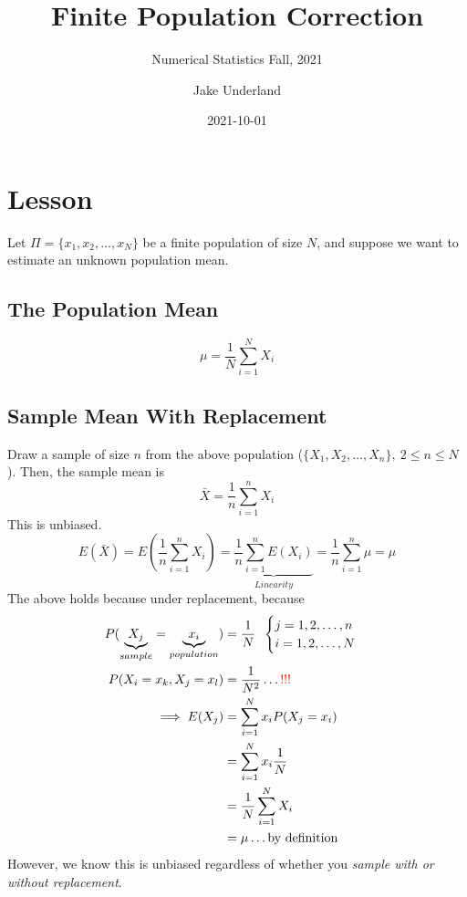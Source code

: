 \documentclass[
]{article}
\title{Finite Population Correction}
\subtitle{Numerical Statistics Fall, 2021}
\author{Jake Underland}
\date{2021-10-01}
\begin{document}
\maketitle

{
\setcounter{tocdepth}{2}
\tableofcontents
}
\hypertarget{lesson}{%
\section{Lesson}\label{lesson}}

Let \(\Pi = \{ x_1, x_2, \dots, x_N\}\) be a finite population of size
\(N\), and suppose we want to estimate an unknown population mean.

\hypertarget{the-population-mean}{%
\subsection{The Population Mean}\label{the-population-mean}}

\[\mu = \frac{1}{N} \sum^N_{i=1} X_i \]

\hypertarget{sample-mean-with-replacement}{%
\subsection{Sample Mean With
Replacement}\label{sample-mean-with-replacement}}

Draw a sample of size \(n\) from the above population
(\(\{X_1, X_2, \dots, X_n\}, \:2 \leq n \leq N\)). Then, the sample mean
is \[\bar{X} = \frac{1}{n}\sum_{i=1}^n X_i\] This is unbiased.
\[E(\bar{X}) = E(\frac{1}{n}\sum_{i=1}^n X_i) = \underbrace{ \frac{1}{n}\sum_{i=1}^n E(X_i)}_{Linearity} =  \frac{1}{n}\sum_{i=1}^n \mu = \mu\]
The above holds because under replacement, because \[\begin{aligned} 
P(\underbrace{X_j}_{sample} = \underbrace{x_i}_{population}) &= \frac{1}{N}\;\; \begin{cases} j = 1, 2, \dots, n \\ i = 1, 2, \dots, N \end{cases} \\
P(X_i = x_k, X_j = x_l) &= \frac{1}{N^2} \dots \color{red}{!!!}\\
\implies E(X_j) &= \sum_{i=1}^{N}x_iP(X_j=x_i) \\
&= \sum_{i=1}^{N}x_i\frac{1}{N} \\
&= \frac{1}{N} \sum^N_{i=1} X_i \\
&= \mu \dots \text{by definition}
\end{aligned}\] However, we know this is unbiased regardless of whether
you \emph{sample with or without replacement}.
\end{document}
